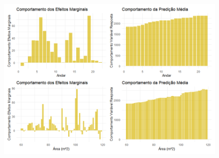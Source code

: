 \documentclass{beamer} %
\newcommand{\1}{\mathbb{I}}
\begin{document}
\begin{frame}
\begin{figure}[H]
    \centering
    
  \includegraphics[scale = .45]{imagens/efeitos_marginais_RF.png}
\end{figure}
\end{frame}



\end{document}

